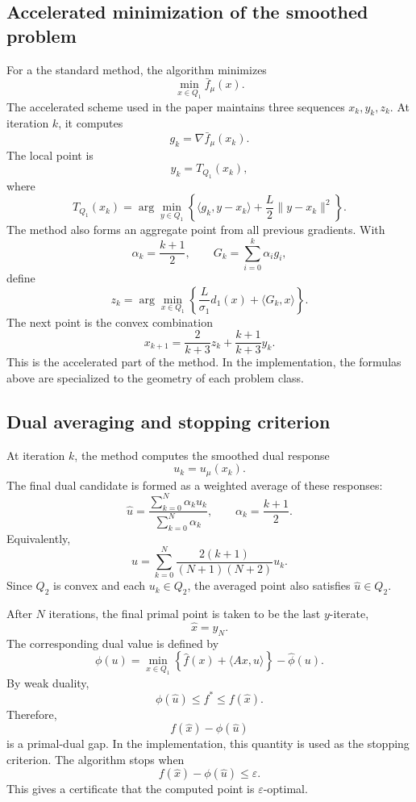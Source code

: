 \documentclass[11pt]{article}
\begin{document}
\subsection{Accelerated minimization of the smoothed problem}

For a the standard method, the algorithm minimizes
\[
    \min_{x\in Q_1}\bar f_\mu(x).
\]
The accelerated scheme used in the paper maintains three sequences
\(x_k,y_k,z_k\). At iteration \(k\), it computes
\[
    g_k=\nabla\bar f_\mu(x_k).
\]
The local point is
\[
    y_k=T_{Q_1}(x_k),
\]
where
\[
    T_{Q_1}(x_k)
    =
    \arg\min_{y\in Q_1}
    \left\{
        \langle g_k,y-x_k\rangle
        +
        \frac{L}{2}\|y-x_k\|^2
    \right\}.
\]
The method also forms an aggregate point from all previous gradients. With
\[
    \alpha_k=\frac{k+1}{2},
    \qquad
    G_k=\sum_{i=0}^k\alpha_i g_i,
\]
define
\[
    z_k
    =
    \arg\min_{x\in Q_1}
    \left\{
        \frac{L}{\sigma_1}d_1(x)+\langle G_k,x\rangle
    \right\}.
\]
The next point is the convex combination
\[
    x_{k+1}
    =
    \frac{2}{k+3}z_k
    +
    \frac{k+1}{k+3}y_k.
\]
This is the accelerated part of the method. In the implementation, the formulas
above are specialized to the geometry of each problem class.

\subsection{Dual averaging and stopping criterion}

At iteration \(k\), the method computes the smoothed dual response
\[
    u_k = u_\mu(x_k).
\]
The final dual candidate is formed as a weighted average of these responses:
\[
    \hat u =
    \frac{\sum_{k=0}^{N}\alpha_k u_k}
         {\sum_{k=0}^{N}\alpha_k},
    \qquad
    \alpha_k=\frac{k+1}{2}.
\]
Equivalently,
\[
    \hat u =
    \sum_{k=0}^{N}
    \frac{2(k+1)}{(N+1)(N+2)}u_k .
\]
Since \(Q_2\) is convex and each \(u_k\in Q_2\), the averaged point also
satisfies \(\hat u\in Q_2\).

After \(N\) iterations, the final primal point is taken to be the last
\(y\)-iterate,
\[
    \hat x = y_N .
\]
The corresponding dual value is defined by
\[
    \phi(u)
    =
    \min_{x\in Q_1}
    \left\{
        \hat f(x)+\langle Ax,u\rangle
    \right\}
    -\hat\phi(u).
\]
By weak duality,
\[
    \phi(\hat u)\le f^*\le f(\hat x).
\]
Therefore,
\[
    f(\hat x)-\phi(\hat u)
\]
is a primal-dual gap. In the implementation, this quantity is used as the
stopping criterion. The algorithm stops when
\[
    f(\hat x)-\phi(\hat u)\le \varepsilon.
\]
This gives a certificate that the computed point is \(\varepsilon\)-optimal.
\end{document}
